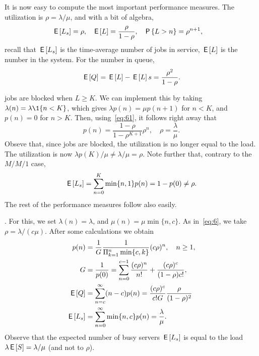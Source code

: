 It is now easy to compute the most important performance measures.
The utilization is $\rho=\lambda/\mu$, and with a bit of algebra,
\begin{align}\label{eq:el}
\,\mathsf{E}\left[L_s\right] &= \rho, & \,\mathsf{E}\left[L\right] &= \frac \rho{1-\rho}, & \,\mathsf{P}\left\{L> n\right\} &= \rho^{n+1},
\end{align}
recall that $\,\mathsf{E}\left[L_s\right]$ is the time-average number of jobs in service, $\,\mathsf{E}\left[L\right]$ is the number in the system. For the number in queue,
\begin{equation*}
\,\mathsf{E}\left[Q\right] = \,\mathsf{E}\left[L\right] - \,\mathsf{E}\left[L\right]s = \frac{\rho^2}{1-\rho}.
\end{equation*}


  jobs are blocked when $L\geq K$.
We can implement this by taking $\lambda(n) = \lambda \1{n < K}$, which
gives $\lambda p(n) = \mu p(n+1)$ for $n<K$, and $p(n) = 0$ for $n>K$.
Then, using~\cref{eq:61}, it follows right away  that
 \begin{equation*}
p(n) = \frac{1-\rho}{1-\rho^{K+1}} \rho^n, \quad \rho = \frac{\lambda}{\mu}.
\end{equation*}
Obseve that, since jobs are blocked, the utilization is no longer equal to the load. The utilization is now $\lambda p(K)/\mu \neq \lambda /\mu = \rho$. Note further that, contrary to the $M/M/1$ case,
\begin{equation*}
\,\mathsf{E}\left[L_s\right] = \sum_{n=0}^K \min\{n, 1\} p(n) = 1-p(0) \neq \rho.
\end{equation*}
The rest of the performance measures follow also easily.

.
For this, we set $\lambda(n) = \lambda$, and $\mu(n) = \mu \min\{n, c\}$.
As in~\cref{eq:6}, we take $\rho=\lambda/(c\mu)$.
After some calculations we obtain
\begin{subequations}
\begin{align}
p(n) &= \frac 1 {G} \frac{1}{\Pi_{k=1}^{n}\min\{c, k\}}(c\rho)^{n} , \quad n\geq 1,\label{eq:1}\\
G &= \frac 1{p(0)} = \sum_{n=0}^{c-1} \frac{(c\rho)^n}{n!} + \frac{(c\rho)^c}{(1-\rho)c!}, \label{eq:501}\\
\,\mathsf{E}\left[Q\right] &= \sum_{n=c}^\infty (n-c) p(n) = \frac{(c\rho)^c}{c! G}\frac{\rho}{(1-\rho)^2}\\
\,\mathsf{E}\left[L_s\right] &= \sum_{n=0}^{\infty}\min\{n,c\} p(n)= \frac{\lambda}\mu.
\end{align}
\end{subequations}
Observe that the expected number of busy servers $\,\mathsf{E}\left[L_s\right]$ is equal to the load $\lambda \,\mathsf{E}\left[S\right]=\lambda/\mu$ (and not to $\rho$).


